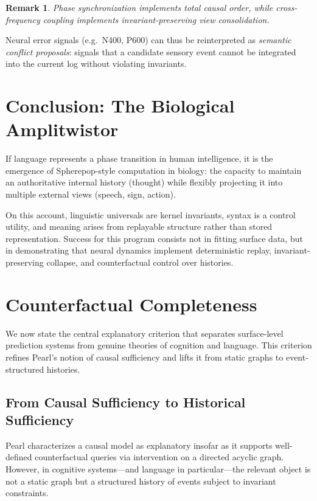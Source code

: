 \documentclass[11pt]{article}
\newtheorem{remark}{Remark}
\begin{document}
\begin{remark}
Phase synchronization implements total causal order, while cross-frequency coupling implements invariant-preserving view consolidation.
\end{remark}

Neural error signals (e.g.\ N400, P600) can thus be reinterpreted as \emph{semantic conflict proposals}: signals that a candidate sensory event cannot be integrated into the current log without violating invariants.

\section{Conclusion: The Biological Amplitwistor}

If language represents a phase transition in human intelligence, it is the emergence of Spherepop-style computation in biology: the capacity to maintain an authoritative internal history (thought) while flexibly projecting it into multiple external views (speech, sign, action).

On this account, linguistic universals are kernel invariants, syntax is a control utility, and meaning arises from replayable structure rather than stored representation. Success for this program consists not in fitting surface data, but in demonstrating that neural dynamics implement deterministic replay, invariant-preserving collapse, and counterfactual control over histories.

\section{Counterfactual Completeness}
\label{sec:counterfactual_completeness}

We now state the central explanatory criterion that separates surface-level prediction systems from genuine theories of cognition and language. This criterion refines Pearl’s notion of causal sufficiency and lifts it from static graphs to event-structured histories.

\subsection{From Causal Sufficiency to Historical Sufficiency}

Pearl characterizes a causal model as explanatory insofar as it supports well-defined counterfactual queries via intervention on a directed acyclic graph. However, in cognitive systems—and language in particular—the relevant object is not a static graph but a structured history of events subject to invariant constraints.
\end{document}
